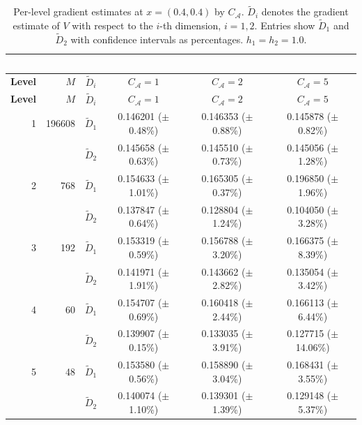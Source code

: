 \documentclass[11pt]{article}
\theoremstyle{definition}
\theoremstyle{plain}
\begin{document}
\begin{longtable}{@{}r r c c c c@{}}
  \caption{Per-level gradient estimates at $x=(0.4,0.4)$ by $C_{\mathcal A}$. 
  $\tilde D_i$ denotes the gradient estimate of $V$ with respect to the $i$-th dimension, $i=1,2$.
  Entries show $\tilde D_1$ and $\tilde D_2$ with confidence intervals as percentages.
  $h_1 = h_2 = 1.0$.}\label{tab:summary-04-dv}\ \\
  \toprule
  \textbf{Level} & \textbf{$M$} & \textbf{$\tilde D_i$} & \textbf{$C_{\mathcal A}=1$} & \textbf{$C_{\mathcal A}=2$} & \textbf{$C_{\mathcal A}=5$} \\
  \midrule
  \endfirsthead
  \toprule
  \textbf{Level} & \textbf{$M$} & \textbf{$\tilde D_i$} & \textbf{$C_{\mathcal A}=1$} & \textbf{$C_{\mathcal A}=2$} & \textbf{$C_{\mathcal A}=5$} \\
  \midrule
  \endhead
  1 & 196608 & $\tilde D_1$ & 0.146201 (\(\pm\) 0.48\%) & 0.146353 (\(\pm\) 0.88\%) & 0.145878 (\(\pm\) 0.82\%) \\
  &         & $\tilde D_2$ & 0.145658 (\(\pm\) 0.63\%) & 0.145510 (\(\pm\) 0.73\%) & 0.145056 (\(\pm\) 1.28\%) \\
  \midrule
  2 & 768     & $\tilde D_1$ & 0.154633 (\(\pm\) 1.01\%) & 0.165305 (\(\pm\) 0.37\%) & 0.196850 (\(\pm\) 1.96\%) \\
  &         & $\tilde D_2$ & 0.137847 (\(\pm\) 0.64\%) & 0.128804 (\(\pm\) 1.24\%) & 0.104050 (\(\pm\) 3.28\%) \\
  \midrule
  3 & 192     & $\tilde D_1$ & 0.153319 (\(\pm\) 0.59\%) & 0.156788 (\(\pm\) 3.20\%) & 0.166375 (\(\pm\) 8.39\%) \\
  &         & $\tilde D_2$ & 0.141971 (\(\pm\) 1.91\%) & 0.143662 (\(\pm\) 2.82\%) & 0.135054 (\(\pm\) 3.42\%) \\
  \midrule
  4 & 60      & $\tilde D_1$ & 0.154707 (\(\pm\) 0.69\%) & 0.160418 (\(\pm\) 2.44\%) & 0.166113 (\(\pm\) 6.44\%) \\
  &         & $\tilde D_2$ & 0.139907 (\(\pm\) 0.15\%) & 0.133035 (\(\pm\) 3.91\%) & 0.127715 (\(\pm\) 14.06\%) \\
  \midrule
  5 & 48      & $\tilde D_1$ & 0.153580 (\(\pm\) 0.56\%) & 0.158890 (\(\pm\) 3.04\%) & 0.168431 (\(\pm\) 3.55\%) \\
  &         & $\tilde D_2$ & 0.140074 (\(\pm\) 1.10\%) & 0.139301 (\(\pm\) 1.39\%) & 0.129148 (\(\pm\) 5.37\%) \\
  \bottomrule
\end{longtable}
\end{document}
